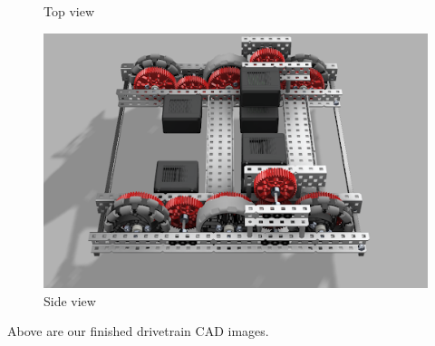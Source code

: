 \begin{figure}[hbt!]
\begin{minipage}{.5\textwidth}
        \caption{Top view}
        \label{fig:topdown}
    \end{minipage}
    \begin{minipage}{.5\textwidth}
        \centering
        \includegraphics[width=.8\linewidth]{images/Sidedown-V1-Drivetrain.png}
        \caption{Side view}
        \label{fig:sidedown}
    \end{minipage}
\end{figure}

Above are our finished drivetrain CAD images.
